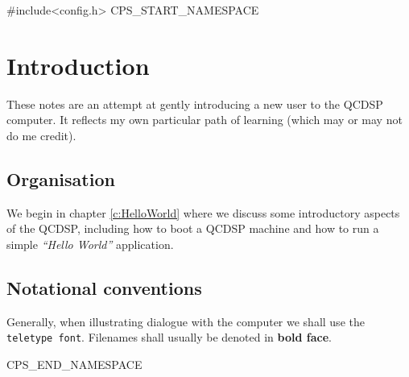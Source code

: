 #include<config.h>
CPS_START_NAMESPACE
\chapter{Introduction}
These notes are an attempt at gently introducing a new
user to the QCDSP computer. It reflects my own particular
path of learning (which may or may not do me credit). 

\section{Organisation}
We begin in chapter \ref{c:HelloWorld} where we discuss
some introductory aspects of the QCDSP, including how 
to boot a QCDSP machine and how to run a simple 
{\em``Hello World''} application.

\section{Notational conventions}
Generally, when illustrating dialogue with the computer
we shall use the {\tt teletype font}. Filenames shall usually
be denoted in {\bf bold face}.

CPS_END_NAMESPACE
